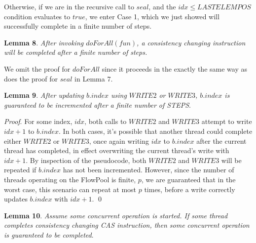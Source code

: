\documentclass[runningheads,a4paper]{llncs}
\begin{document}
\begin{itemize}


Otherwise, if we are in the recursive call to $seal$, and the $idx \leq
LASTELEMPOS$ condition evaluates to $true$, we enter Case 1, which we just
showed will successfully complete in a finite number of steps.

\end{itemize}



\textbf{Lemma 8}. \textit{After invoking $doForAll(fun)$, a consistency
changing instruction will be completed after a finite number of steps.}

We omit the proof for $doForAll$ since it proceeds in the exactly the same way
as does the proof for $seal$ in Lemma 7.


\textbf{Lemma 9}. \textit{After updating $b.index$ using $WRITE2$ or $WRITE3$, 
$b.index$ is guaranteed to be incremented after a finite number of STEPS}.

\textit{Proof}. For some index, $idx$, both calls to $WRITE2$ and $WRITE3$
attempt to write $idx+1$ to $b.index$. In both cases, it's possible that
another thread could complete either $WRITE2$ or $WRITE3$, once again writing
$idx$ to $b.index$ after the current thread has completed, in effect
overwriting the current thread's write with $idx+1$. By inspection of the
pseudocode, both $WRITE2$ and $WRITE3$ will be repeated if $b.index$ has not
been incremented. However, since the number of threads operating on the
FlowPool is finite, $p$, we are guaranteed that in the worst case, this
scenario can repeat at most $p$ times, before a write correctly updates
$b.index$ with $idx+1$.
\qed


\textbf{Lemma 10}. \textit{Assume some concurrent operation is started. If
some thread completes consistency changing CAS instruction, then some
concurrent operation is guaranteed to be completed}.
\end{document}

